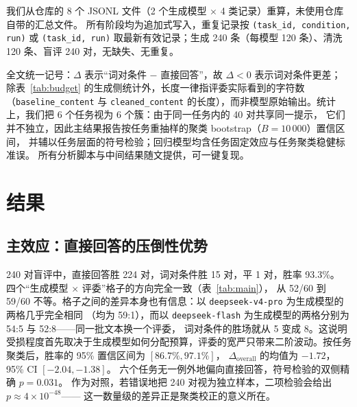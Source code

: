 \documentclass[UTF8,11pt,a4paper]{ctexart}
\newcommand{\deepflash}{\texttt{deepseek-flash}}
\newcommand{\deeppro}{\texttt{deepseek-v4-pro}}
\begin{document}
我们从仓库的 8 个 JSONL 文件（2 个生成模型 $\times$ 4 类记录）重算，未使用仓库自带的汇总文件。
所有阶段均为追加式写入，重复记录按 \texttt{(task\_id, condition, run)} 或 \texttt{(task\_id, run)}
取最新有效记录；生成 240 条（每模型 120 条）、清洗 120 条、盲评 240 对，无缺失、无重复。

全文统一记号：$\Delta$ 表示“词对条件 $-$ 直接回答”，故 $\Delta<0$ 表示词对条件更差；
除表~\ref{tab:budget} 的生成侧统计外，长度一律指评委实际看到的字符数
（\texttt{baseline\_content} 与 \texttt{cleaned\_content} 的长度），而非模型原始输出。统计上，我们把 6 个任务视为 6 个簇：由于同一任务内的 40 对共享同一提示，
它们并不独立，因此主结果报告按任务重抽样的聚类 bootstrap（$B=10\,000$）置信区间，
并辅以任务层面的符号检验；回归模型均含任务固定效应与任务聚类稳健标准误。
所有分析脚本与中间结果随文提供，可一键复现。

\section{结果}

\subsection{主效应：直接回答的压倒性优势}

240 对盲评中，直接回答胜 224 对，词对条件胜 15 对，平 1 对，胜率 93.3\%。
四个“生成模型 $\times$ 评委”格子的方向完全一致（表~\ref{tab:main}），
从 52/60 到 59/60 不等。格子之间的差异本身也有信息：以 \deeppro{} 为生成模型的两格几乎完全相同
（均为 59:1），而以 \deepflash{} 为生成模型的两格分别为 54:5 与 52:8——同一批文本换一个评委，
词对条件的胜场就从 5 变成 8。这说明受损程度首先取决于生成模型如何分配预算，评委的宽严只带来二阶波动。按任务聚类后，胜率的 95\% 置信区间为 $[86.7\%, 97.1\%]$，
$\Delta_{\text{overall}}$ 的均值为 $-1.72$，95\% CI $[-2.04, -1.38]$。
六个任务无一例外地偏向直接回答，符号检验的双侧精确 $p=0.031$。
作为对照，若错误地把 240 对视为独立样本，二项检验会给出 $p\approx4\times10^{-48}$——
这一数量级的差异正是聚类校正的意义所在。
\end{document}
